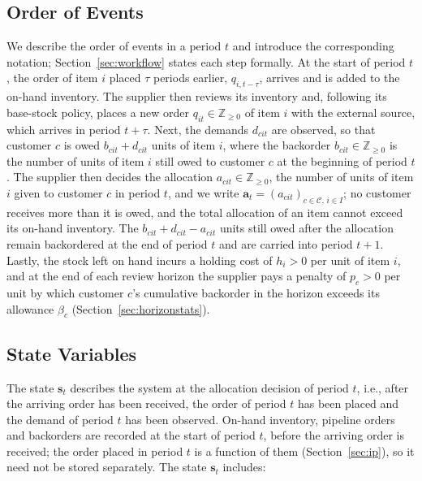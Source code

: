 \documentclass[11pt, a4paper]{article}
\theoremstyle{definition}
\theoremstyle{remark}
\begin{document}
\subsection{Order of Events}
\label{sec:events}

We describe the order of events in a period $t$ and introduce the corresponding notation; Section~\ref{sec:workflow} states each step formally. At the start of period $t$, the order of item $i$ placed $\tau$ periods earlier, $q_{i,t-\tau}$, arrives and is added to the on-hand inventory. The supplier then reviews its inventory and, following its base-stock policy, places a new order $q_{it} \in \mathbb{Z}_{\geq 0}$ of item $i$ with the external source, which arrives in period $t+\tau$. Next, the demands $d_{cit}$ are observed, so that customer $c$ is owed $b_{cit} + d_{cit}$ units of item $i$, where the backorder $b_{cit} \in \mathbb{Z}_{\geq 0}$ is the number of units of item $i$ still owed to customer $c$ at the beginning of period $t$. The supplier then decides the allocation $a_{cit} \in \mathbb{Z}_{\geq 0}$, the number of units of item $i$ given to customer $c$ in period $t$, and we write $\mathbf{a}_t = (a_{cit})_{c \in \mathcal{C},\, i \in I}$; no customer receives more than it is owed, and the total allocation of an item cannot exceed its on-hand inventory. The $b_{cit} + d_{cit} - a_{cit}$ units still owed after the allocation remain backordered at the end of period $t$ and are carried into period $t+1$. Lastly, the stock left on hand incurs a holding cost of $h_i > 0$ per unit of item $i$, and at the end of each review horizon the supplier pays a penalty of $p_c > 0$ per unit by which customer $c$'s cumulative backorder in the horizon exceeds its allowance $\beta_c$ (Section~\ref{sec:horizonstats}).

\subsection{State Variables}
\label{sec:state}

The state $\mathbf{s}_t$ describes the system at the allocation decision of period $t$, i.e., after the arriving order has been received, the order of period $t$ has been placed and the demand of period $t$ has been observed. On-hand inventory, pipeline orders and backorders are recorded at the start of period $t$, before the arriving order is received; the order placed in period $t$ is a function of them (Section~\ref{sec:ip}), so it need not be stored separately. The state $\mathbf{s}_t$ includes:
\end{document}
